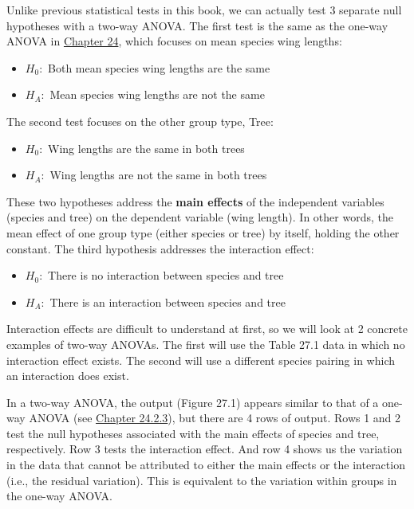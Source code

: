 \documentclass[
]{scrbook}
\providecommand{\tightlist}{%
  \setlength{\itemsep}{0pt}\setlength{\parskip}{0pt}}
\begin{document}
Unlike previous statistical tests in this book, we can actually test 3 separate null hypotheses with a two-way ANOVA.
The first test is the same as the one-way ANOVA in \protect\hyperlink{Chapter_24}{Chapter 24}, which focuses on mean species wing lengths:

\begin{itemize}
\tightlist
\item
  \(H_{0}:\) Both mean species wing lengths are the same
\item
  \(H_{A}:\) Mean species wing lengths are not the same
\end{itemize}

The second test focuses on the other group type, Tree:

\begin{itemize}
\tightlist
\item
  \(H_{0}:\) Wing lengths are the same in both trees
\item
  \(H_{A}:\) Wing lengths are not the same in both trees
\end{itemize}

These two hypotheses address the \textbf{main effects} of the independent variables (species and tree) on the dependent variable (wing length).
In other words, the mean effect of one group type (either species or tree) by itself, holding the other constant.
The third hypothesis addresses the interaction effect:

\begin{itemize}
\tightlist
\item
  \(H_{0}:\) There is no interaction between species and tree
\item
  \(H_{A}:\) There is an interaction between species and tree
\end{itemize}

Interaction effects are difficult to understand at first, so we will look at 2 concrete examples of two-way ANOVAs.
The first will use the Table 27.1 data in which no interaction effect exists.
The second will use a different species pairing in which an interaction does exist.

In a two-way ANOVA, the output (Figure 27.1) appears similar to that of a one-way ANOVA (see \protect\hyperlink{anova-f-statistic-calculation}{Chapter 24.2.3}), but there are 4 rows of output.
Rows 1 and 2 test the null hypotheses associated with the main effects of species and tree, respectively.
Row 3 tests the interaction effect.
And row 4 shows us the variation in the data that cannot be attributed to either the main effects or the interaction (i.e., the residual variation).
This is equivalent to the variation within groups in the one-way ANOVA.
\end{document}
